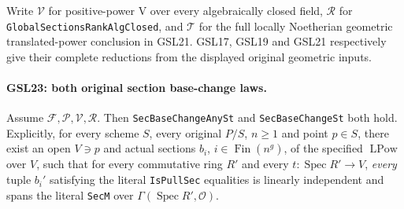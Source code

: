 \documentclass[11pt,a4paper]{article}
\numberwithin{equation}{section}
\theoremstyle{remark}\newtheorem{remark}[theorem]{Remark}
\begin{document}
Write $\mathcal V$ for positive-power $\mathrm V$ over every
algebraically closed field, $\mathcal R$ for
\texttt{Global\allowbreak Sections\allowbreak Rank\allowbreak Alg\allowbreak Closed}, and $\mathcal T$ for the
full locally Noetherian geometric translated-power conclusion in
GSL21.  GSL17, GSL19 and GSL21 respectively give their complete
reductions from the displayed original geometric inputs.

\paragraph{GSL23: both original section base-change laws.}
\label{claim:GSL23}
Assume $\mathcal F,\mathcal P,\mathcal V,\mathcal R$.
Then \texttt{Sec\allowbreak Base\allowbreak Change\allowbreak Any\allowbreak St} and \texttt{Sec\allowbreak Base\allowbreak Change\allowbreak St} both
hold.  Explicitly, for every scheme $S$, every original $P/S$,
$n\ge1$ and point $p\in S$, there exist an open $V\ni p$
and actual sections $b_i$, $i\in\operatorname{Fin}(n^g)$,
of the specified $\operatorname{LPow}$ over $V$, such that
for every commutative ring $R'$ and every
$t:\operatorname{Spec}R'\to V$, \emph{every} tuple $b_i'$
satisfying the literal \texttt{Is\allowbreak Pull\allowbreak Sec} equalities is
linearly independent and spans the literal \texttt{Sec\allowbreak M}
over $\Gamma(\operatorname{Spec}R',\mathcal O)$.
\end{document}
